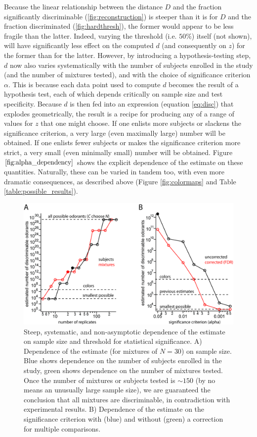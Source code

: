 \documentclass[letterpaper,twocolumn,10pt]{article}
\begin{document}
Because the linear relationship between the distance $D$ and the fraction significantly discriminable (\ref{fig:reconstruction}) is steeper than it is for $D$ and the fraction discriminated (\ref{fig:hardthresh}), 
the former would appear to be less fragile than the latter.  
Indeed, varying the threshold (i.e. $50\%$) itself (not shown), 
will have significantly less effect on the computed $d$ (and consequently on $z$) for the former than for the latter.  
However, by introducing a hypothesis-testing step, $d$ now also varies systematically with the number of subjects enrolled in the study (and the number of mixtures tested), 
and with the choice of significance criterion $\alpha$.  
This is because each data point used to compute $d$ becomes the result of a hypothesis test, 
each of which depends critically on sample size and test specificity.  
Because $d$ is then fed into an expression (equation \ref{eq:disc}) that explodes geometrically, 
the result is a recipe for producing any of a range of values for $z$ that one might choose. 
If one enlists more subjects or slackens the significance criterion, 
a very large (even maximally large) number will be obtained. 
If one enlists fewer subjects or makes the significance criterion more strict, 
a very small (even minimally small) number will be obtained. 
Figure $\ref{fig:alpha_dependency}$ shows the explicit dependence of the estimate on these quantities. 
Naturally, these can be varied in tandem too, with even more dramatic consequences, 
as described above (Figure \ref{fig:colormaps} and Table \ref{table:possible_results}). 

\begin{figure}
    \centering
    \includegraphics[width=1.0\textwidth]{figures/Fig8_T_alpha_dependency}
    \caption{
Steep, systematic, and non-asymptotic dependence of the estimate on sample size and threshold for statistical significance. 
A) Dependence of the estimate (for mixtures of $N=30$) on sample size. 
Blue shows dependence on the number of subjects enrolled in the study, 
green shows dependence on the number of mixtures tested. 
Once the number of mixtures or subjects tested is $\sim 150$ (by no means an unusually large sample size), 
we are guaranteed the conclusion that all mixtures are discriminable, in contradiction with experimental results. 
B) Dependence of the estimate on the significance criterion with (blue) and without (green) a correction for multiple comparisons.}
    \label{fig:alpha_dependency}
\end{figure} 
\end{document}
